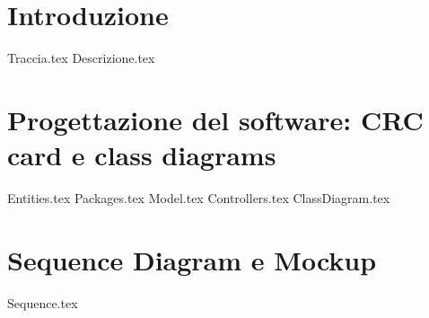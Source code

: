 \documentclass[a4paper, oneside, 10pt]{book}
\begin{document}
\chapter{Introduzione}
	{Traccia.tex}
	{Descrizione.tex}
\chapter{Progettazione del software: CRC card e class diagrams}
	{Entities.tex}
	{Packages.tex}
	{Model.tex}
	{Controllers.tex}
	{ClassDiagram.tex}
\chapter{Sequence Diagram e Mockup}
	{Sequence.tex}
\end{document}
